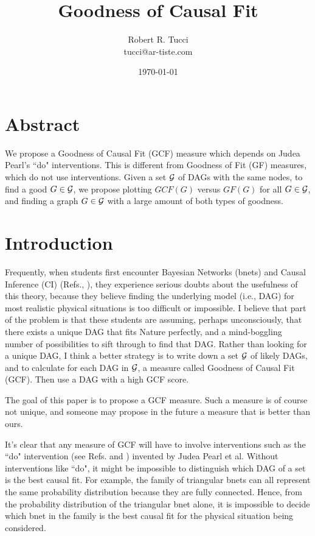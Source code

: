 \documentclass[12pt]{article}
\begin{document}
\title{Goodness of Causal Fit}
\date{ \today}
\author{Robert R. Tucci\\
        tucci@ar-tiste.com}
\maketitle
\vskip2cm
\section*{Abstract}
We propose a 
Goodness of Causal Fit (GCF) measure
which depends 
on Judea Pearl's ``do" interventions.
This is different
from Goodness of Fit (GF) measures,
which do not use interventions.
Given a set ${\cal G}$
of DAGs with the same nodes,
to find a good $G\in {\cal G}$,
we propose plotting
$GCF(G)$ versus $GF(G)$
for all $G\in {\cal G}$,
and finding a 
graph $G\in {\cal G}$  with 
a large amount 
of both types of goodness.


\newpage
\section{Introduction}



Frequently,
when students
first encounter
Bayesian Networks (bnets)
and Causal Inference (CI)
(Refs.\cite{pearl-2013book},
\cite{bayesuvius}),
they experience serious doubts
about the usefulness of this
theory, because they believe
finding the underlying model 
(i.e., DAG)
for most realistic
 physical situations is
too difficult or impossible.
I believe
that part of the problem
is that these students
are assuming, perhaps
unconsciously,
that there exists
a unique DAG
that fits Nature perfectly,
and a mind-boggling number
 of possibilities
to sift through to find that DAG.
Rather than looking
for a unique DAG,
I think a better strategy
is to write down
a set ${\cal G}$ 
of likely DAGs,
and to calculate for 
each DAG in ${\cal G}$,
 a measure called 
Goodness of Causal Fit (GCF).
Then use a DAG with
 a high GCF score.
 
 The goal of this paper
 is to propose a GCF measure.
 Such a measure is of course
 not unique,
 and someone may propose 
 in the future a measure that is better
 than ours.
 
 
 It's clear that any measure
 of GCF will have to
 involve interventions
 such as the ``do" intervention
 (see 
 Refs. \cite{pearl-2013book}
 and \cite{bayesuvius})
 invented by Judea Pearl et al.
 Without interventions like ``do",
 it might be impossible
 to distinguish which DAG
 of a set is the best causal fit.
 For example, the family of triangular
 bnets can 
 all represent the same
 probability distribution
 because they are fully connected.
Hence, from the 
probability distribution of the
triangular bnet alone,
it is impossible to decide
which bnet in the family is
the best causal fit for the
physical situation 
being considered.
\end{document}
